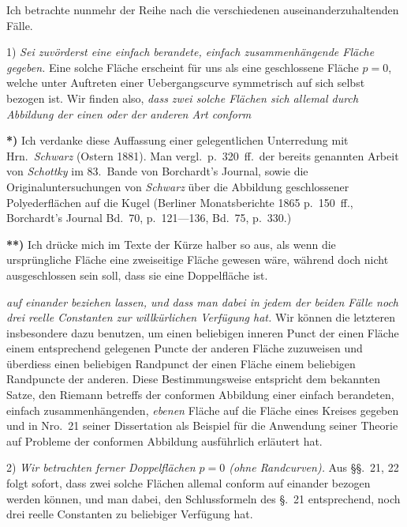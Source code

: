 \documentclass{article}
\begin{document}
Ich betrachte nunmehr der Reihe nach die verschiedenen auseinanderzuhaltenden Fälle.

1) \emph{Sei zuvörderst eine einfach berandete, einfach zusammenhängende Fläche gegeben.} Eine solche Fläche erscheint für uns als eine geschlossene Fläche $p = 0$, welche unter Auftreten einer Uebergangscurve symmetrisch auf sich selbst bezogen ist. Wir finden also, \emph{dass zwei solche Flächen sich allemal durch Abbildung der einen oder der anderen Art conform}

\textbf{*)} Ich verdanke diese Auffassung einer gelegentlichen Unterredung mit Hrn.\ \emph{Schwarz} (Ostern 1881). Man vergl.\ p.~320~ff.\ der bereits genannten Arbeit von \emph{Schottky} im 83.\ Bande von Borchardt's Journal, sowie die Originaluntersuchungen von \emph{Schwarz} über die Abbildung geschlossener Polyederflächen auf die Kugel (Berliner Monatsberichte 1865 p.~150~ff., Borchardt's Journal Bd.~70, p.~121---136, Bd.~75, p.~330.)

\textbf{**)} Ich drücke mich im Texte der Kürze halber so aus, als wenn die ursprüngliche Fläche eine zweiseitige Fläche gewesen wäre, während doch nicht ausgeschlossen sein soll, dass sie eine Doppelfläche ist.

\emph{auf einander beziehen lassen, und dass man dabei in jedem der beiden Fälle noch drei reelle Constanten zur willkürlichen Verfügung hat.} Wir können die letzteren insbesondere dazu benutzen, um einen beliebigen inneren Punct der einen Fläche einem entsprechend gelegenen Puncte der anderen Fläche zuzuweisen und überdiess einen beliebigen Randpunct der einen Fläche einem beliebigen Randpuncte der anderen. Diese Bestimmungsweise entspricht dem bekannten Satze, den Riemann betreffs der conformen Abbildung einer einfach berandeten, einfach zusammenhängenden, \emph{ebenen} Fläche auf die Fläche eines Kreises gegeben und in Nro.~21 seiner Dissertation als Beispiel für die Anwendung seiner Theorie auf Probleme der conformen Abbildung ausführlich erläutert hat.

2) \emph{Wir betrachten ferner Doppelflächen $p = 0$ (ohne Randcurven).} Aus §§.~21, 22 folgt sofort, dass zwei solche Flächen allemal conform auf einander bezogen werden können, und man dabei, den Schlussformeln des §.~21 entsprechend, noch drei reelle Constanten zu beliebiger Verfügung hat.
\end{document}
